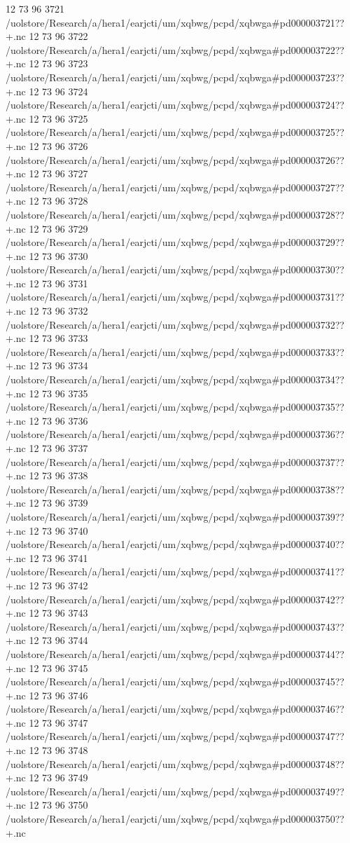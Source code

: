 12 73 96
3721
/uolstore/Research/a/hera1/earjcti/um/xqbwg/pcpd/xqbwga#pd000003721??+.nc
12 73 96
3722
/uolstore/Research/a/hera1/earjcti/um/xqbwg/pcpd/xqbwga#pd000003722??+.nc
12 73 96
3723
/uolstore/Research/a/hera1/earjcti/um/xqbwg/pcpd/xqbwga#pd000003723??+.nc
12 73 96
3724
/uolstore/Research/a/hera1/earjcti/um/xqbwg/pcpd/xqbwga#pd000003724??+.nc
12 73 96
3725
/uolstore/Research/a/hera1/earjcti/um/xqbwg/pcpd/xqbwga#pd000003725??+.nc
12 73 96
3726
/uolstore/Research/a/hera1/earjcti/um/xqbwg/pcpd/xqbwga#pd000003726??+.nc
12 73 96
3727
/uolstore/Research/a/hera1/earjcti/um/xqbwg/pcpd/xqbwga#pd000003727??+.nc
12 73 96
3728
/uolstore/Research/a/hera1/earjcti/um/xqbwg/pcpd/xqbwga#pd000003728??+.nc
12 73 96
3729
/uolstore/Research/a/hera1/earjcti/um/xqbwg/pcpd/xqbwga#pd000003729??+.nc
12 73 96
3730
/uolstore/Research/a/hera1/earjcti/um/xqbwg/pcpd/xqbwga#pd000003730??+.nc
12 73 96
3731
/uolstore/Research/a/hera1/earjcti/um/xqbwg/pcpd/xqbwga#pd000003731??+.nc
12 73 96
3732
/uolstore/Research/a/hera1/earjcti/um/xqbwg/pcpd/xqbwga#pd000003732??+.nc
12 73 96
3733
/uolstore/Research/a/hera1/earjcti/um/xqbwg/pcpd/xqbwga#pd000003733??+.nc
12 73 96
3734
/uolstore/Research/a/hera1/earjcti/um/xqbwg/pcpd/xqbwga#pd000003734??+.nc
12 73 96
3735
/uolstore/Research/a/hera1/earjcti/um/xqbwg/pcpd/xqbwga#pd000003735??+.nc
12 73 96
3736
/uolstore/Research/a/hera1/earjcti/um/xqbwg/pcpd/xqbwga#pd000003736??+.nc
12 73 96
3737
/uolstore/Research/a/hera1/earjcti/um/xqbwg/pcpd/xqbwga#pd000003737??+.nc
12 73 96
3738
/uolstore/Research/a/hera1/earjcti/um/xqbwg/pcpd/xqbwga#pd000003738??+.nc
12 73 96
3739
/uolstore/Research/a/hera1/earjcti/um/xqbwg/pcpd/xqbwga#pd000003739??+.nc
12 73 96
3740
/uolstore/Research/a/hera1/earjcti/um/xqbwg/pcpd/xqbwga#pd000003740??+.nc
12 73 96
3741
/uolstore/Research/a/hera1/earjcti/um/xqbwg/pcpd/xqbwga#pd000003741??+.nc
12 73 96
3742
/uolstore/Research/a/hera1/earjcti/um/xqbwg/pcpd/xqbwga#pd000003742??+.nc
12 73 96
3743
/uolstore/Research/a/hera1/earjcti/um/xqbwg/pcpd/xqbwga#pd000003743??+.nc
12 73 96
3744
/uolstore/Research/a/hera1/earjcti/um/xqbwg/pcpd/xqbwga#pd000003744??+.nc
12 73 96
3745
/uolstore/Research/a/hera1/earjcti/um/xqbwg/pcpd/xqbwga#pd000003745??+.nc
12 73 96
3746
/uolstore/Research/a/hera1/earjcti/um/xqbwg/pcpd/xqbwga#pd000003746??+.nc
12 73 96
3747
/uolstore/Research/a/hera1/earjcti/um/xqbwg/pcpd/xqbwga#pd000003747??+.nc
12 73 96
3748
/uolstore/Research/a/hera1/earjcti/um/xqbwg/pcpd/xqbwga#pd000003748??+.nc
12 73 96
3749
/uolstore/Research/a/hera1/earjcti/um/xqbwg/pcpd/xqbwga#pd000003749??+.nc
12 73 96
3750
/uolstore/Research/a/hera1/earjcti/um/xqbwg/pcpd/xqbwga#pd000003750??+.nc
